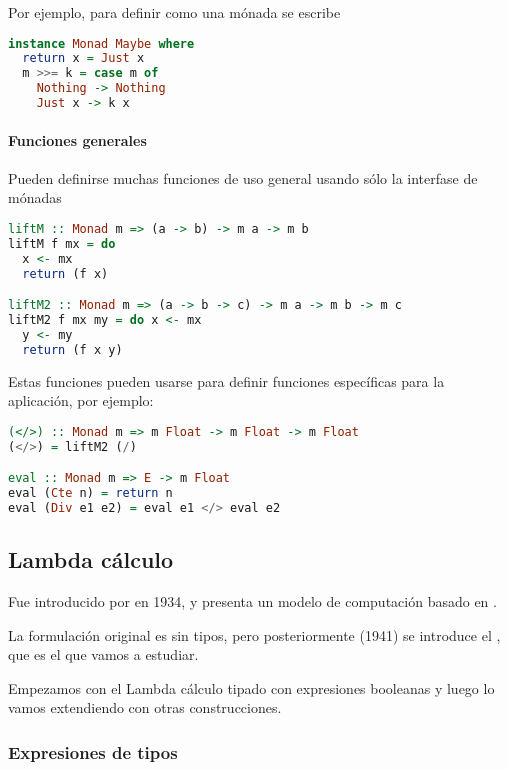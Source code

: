 Por ejemplo, para definir  como una mónada se escribe

\begin{lstlisting}[language=Haskell]
instance Monad Maybe where
  return x = Just x
  m >>= k = case m of
    Nothing -> Nothing
    Just x -> k x
\end{lstlisting}

\paragraph{Funciones generales}

Pueden definirse muchas funciones de uso general usando sólo la interfase de mónadas
\begin{lstlisting}[language=Haskell]
liftM :: Monad m => (a -> b) -> m a -> m b
liftM f mx = do
  x <- mx
  return (f x)

liftM2 :: Monad m => (a -> b -> c) -> m a -> m b -> m c
liftM2 f mx my = do x <- mx
  y <- my
  return (f x y)
\end{lstlisting}

Estas funciones pueden usarse para definir funciones específicas para la aplicación, por ejemplo:

\begin{lstlisting}[language=Haskell]
(</>) :: Monad m => m Float -> m Float -> m Float
(</>) = liftM2 (/)

eval :: Monad m => E -> m Float
eval (Cte n) = return n
eval (Div e1 e2) = eval e1 </> eval e2
\end{lstlisting}

\subsection{Lambda cálculo}

Fue introducido por  en 1934, y presenta un modelo de computación basado en .

La formulación original es sin tipos, pero posteriormente (1941) se introduce el , que es el que vamos a estudiar.

Empezamos con el Lambda cálculo tipado con expresiones booleanas y luego lo vamos extendiendo con otras construcciones.

\subsubsection{Expresiones de tipos}

